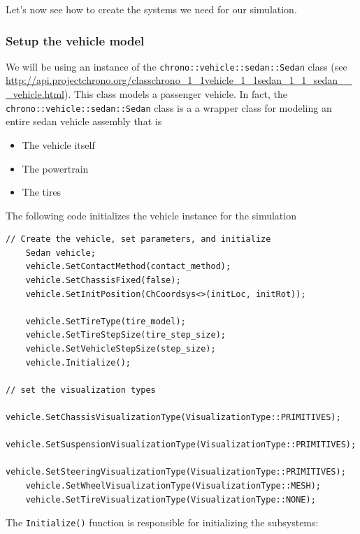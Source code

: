 Let's now see how to create the systems we need for our simulation.


\subsubsection{Setup the vehicle model}

We will be using an instance of the \lstinline{chrono::vehicle::sedan::Sedan} class (see \url{http://api.projectchrono.org/classchrono_1_1vehicle_1_1sedan_1_1_sedan___vehicle.html}).
This class models a passenger vehicle. In fact, the \lstinline{chrono::vehicle::sedan::Sedan} class is a  a wrapper class for modeling an entire sedan vehicle assembly
that is
\begin{itemize}
\item The vehicle itself
\item The powertrain
\item The tires
\end{itemize}

The following code initializes the vehicle instance for the simulation

\begin{lstlisting}
// Create the vehicle, set parameters, and initialize
    Sedan vehicle;
    vehicle.SetContactMethod(contact_method);
    vehicle.SetChassisFixed(false);
    vehicle.SetInitPosition(ChCoordsys<>(initLoc, initRot));
    
    vehicle.SetTireType(tire_model);
    vehicle.SetTireStepSize(tire_step_size);
    vehicle.SetVehicleStepSize(step_size);
    vehicle.Initialize();

// set the visualization types
    vehicle.SetChassisVisualizationType(VisualizationType::PRIMITIVES); 
    vehicle.SetSuspensionVisualizationType(VisualizationType::PRIMITIVES); 
    vehicle.SetSteeringVisualizationType(VisualizationType::PRIMITIVES); 
    vehicle.SetWheelVisualizationType(VisualizationType::MESH); 
    vehicle.SetTireVisualizationType(VisualizationType::NONE); 
\end{lstlisting}

The \lstinline{Initialize()} function is responsible for initializing the subsystems:

